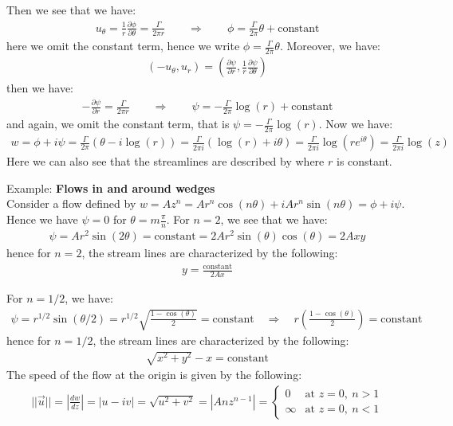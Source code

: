 \documentclass[11pt]{book}
\theoremstyle{break}
\theoremstyle{break}
\newcommand{\example}{\color{green}Example: \color{black}}
\begin{document}
Then we see that we have:
\begin{align*}
u_{\theta} = \frac{1}{r}\frac{\partial \phi}{\partial \theta} = \frac{\Gamma}{2\pi r} \qquad\Rightarrow \qquad \phi = \frac{\Gamma}{2\pi}\theta+\text{constant}
\end{align*}
here we omit the constant term, hence we write $\phi = \frac{\Gamma}{2\pi}\theta $. Moreover, we have:
\begin{align*}
(-u_{\theta}, u_r) = \left( \frac{\partial \psi}{\partial r}, \frac{1}{r}\frac{\partial \psi}{\partial \theta}\right)
\end{align*}
then we have:
\begin{align*}
-\frac{\partial \psi}{\partial r} = \frac{\Gamma}{2\pi r} \qquad \Rightarrow \qquad \psi = -\frac{\Gamma}{2\pi}\log(r) + \text{constant}
\end{align*}
and again, we omit the constant term, that is $\psi =  -\frac{\Gamma}{2\pi}\log(r) $. Now we have:
\begin{align*}
w = \phi + i\psi = \frac{\Gamma}{2\pi}\left( \theta - i \log(r)\right) = \frac{\Gamma}{2\pi i}( \log(r) + i\theta) = \frac{\Gamma}{2\pi i}\log(re^{i\theta}) = \frac{\Gamma}{2\pi i}\log (z)
\end{align*}
Here we can also see that the streamlines are described by where $r$ is constant.


\hfill\break
\hfill\break
\example \textbf{Flows in and around wedges}\\
Consider a flow defined by $w = Az^n = Ar^n \cos(n \theta) + i Ar^n \sin(n \theta) = \phi + i\psi$. \\
Hence we have $\psi = 0$ for $\theta = m\frac{\pi}{n}$. For $n=2$, we see that we have:
\begin{align*}
\psi = Ar^2 \sin(2\theta) = \text{constant} = 2Ar^2 \sin(\theta) \cos(\theta) = 2A xy
\end{align*}
hence for $n=2$, the stream lines are characterized by the following:
\begin{align*}
y = \frac{\text{constant}}{2Ax}
\end{align*}

For $n = 1/2$, we have:
\begin{align*}
\psi = r^{1/2}\sin(\theta/2) = r^{1/2}\sqrt{\frac{1-\cos(\theta)}{2}} = \text{constant} \quad \Rightarrow \quad r\left( \frac{1-\cos(\theta)}{2}\right) = \text{constant}
\end{align*}
hence for $n=1/2$, the stream lines are characterized by the following:
\begin{align*}
\sqrt{x^2 + y^2 }-x = \text{constant}
\end{align*}
The speed of the flow at the origin is given by the following:
\begin{align*}
||\vec{u}|| = \left|\frac{dw}{dz}\right| = \left|u-iv\right| = \sqrt{u^2 + v^2} = |An z^{n-1}| = \begin{cases}
0 & \text{at }z=0, \ n>1\\
\infty &\text{at }z=0, \ n<1
\end{cases}
\end{align*}
\end{document}
